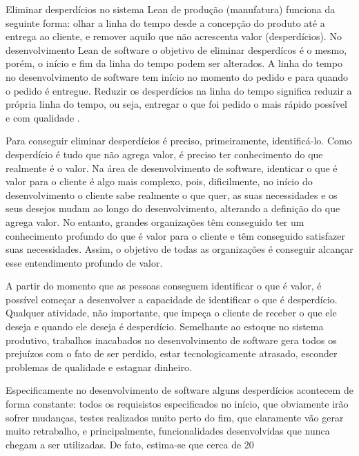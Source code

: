 Eliminar desperdícios no sistema Lean de produção (manufatura) funciona da seguinte forma: olhar a linha do tempo desde a concepção do produto até a entrega ao cliente, e remover aquilo que não acrescenta valor (desperdícios). No desenvolvimento Lean de software o objetivo de eliminar desperdícos é o mesmo, porém, o início e  fim da linha do tempo podem ser alterados. A linha do tempo no desenvolvimento de software tem início no momento do pedido e para quando o pedido é entregue. Reduzir os desperdícios na linha do tempo significa reduzir a própria linha do tempo, ou seja, entregar o que foi pedido o mais rápido possível e com qualidade  \cite{poppendieck}.

Para conseguir eliminar desperdícios é preciso, primeiramente, identificá-lo. Como desperdício é tudo que não agrega valor, é preciso ter conhecimento do que realmente é o valor. Na área de desenvolvimento de software, identicar o que é valor para o cliente é algo mais complexo, pois, dificilmente, no início do desenvolvimento o cliente sabe realmente o que quer, as suas necessidades e os seus desejos mudam ao longo do desenvolvimento, alterando a definição do que agrega valor. No entanto, grandes organizações têm conseguido ter um conhecimento profundo do que é valor para o cliente e têm conseguido satisfazer suas necessidades. Assim, o objetivo de todas as organizações é conseguir alcançar esse entendimento profundo de valor.

A partir do momento que as pessoas conseguem identificar o que é valor, é possível começar a desenvolver a capacidade de identificar o que é desperdício. Qualquer atividade, não importante, que impeça o cliente de receber o que ele deseja e quando ele deseja é desperdício. Semelhante ao estoque no sistema produtivo, trabalhos inacabados no desenvolvimento de software gera todos os prejuízos com o fato de ser perdido, estar tecnologicamente atrasado, esconder problemas de qualidade e estagnar dinheiro.

Especificamente no desenvolvimento de software alguns desperdícios acontecem de forma constante: todos os requisistos especificados no início, que obviamente irão sofrer mudanças, testes realizados muito perto do fim, que claramente vão gerar muito retrabalho, e principalmente, funcionalidades desenvolvidas que nunca chegam a ser utilizadas.  De fato, estima-se que cerca de 20%

